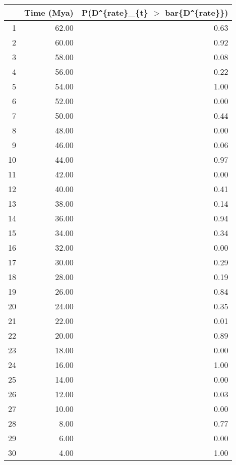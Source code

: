 \begin{table}[ht]
\centering
\begin{tabular}{rrr}
  \hline
 & Time (Mya) & P(D\verb|^|\{rate\}\_\{t\} $>$ bar\{D\verb|^|\{rate\}\}) \\ 
  \hline
1 & 62.00 & 0.63 \\ 
  2 & 60.00 & 0.92 \\ 
  3 & 58.00 & 0.08 \\ 
  4 & 56.00 & 0.22 \\ 
  5 & 54.00 & 1.00 \\ 
  6 & 52.00 & 0.00 \\ 
  7 & 50.00 & 0.44 \\ 
  8 & 48.00 & 0.00 \\ 
  9 & 46.00 & 0.06 \\ 
  10 & 44.00 & 0.97 \\ 
  11 & 42.00 & 0.00 \\ 
  12 & 40.00 & 0.41 \\ 
  13 & 38.00 & 0.14 \\ 
  14 & 36.00 & 0.94 \\ 
  15 & 34.00 & 0.34 \\ 
  16 & 32.00 & 0.00 \\ 
  17 & 30.00 & 0.29 \\ 
  18 & 28.00 & 0.19 \\ 
  19 & 26.00 & 0.84 \\ 
  20 & 24.00 & 0.35 \\ 
  21 & 22.00 & 0.01 \\ 
  22 & 20.00 & 0.89 \\ 
  23 & 18.00 & 0.00 \\ 
  24 & 16.00 & 1.00 \\ 
  25 & 14.00 & 0.00 \\ 
  26 & 12.00 & 0.03 \\ 
  27 & 10.00 & 0.00 \\ 
  28 & 8.00 & 0.77 \\ 
  29 & 6.00 & 0.00 \\ 
  30 & 4.00 & 1.00 \\ 
   \hline
\end{tabular}
\label{tab:rate_peak}
\end{table}
